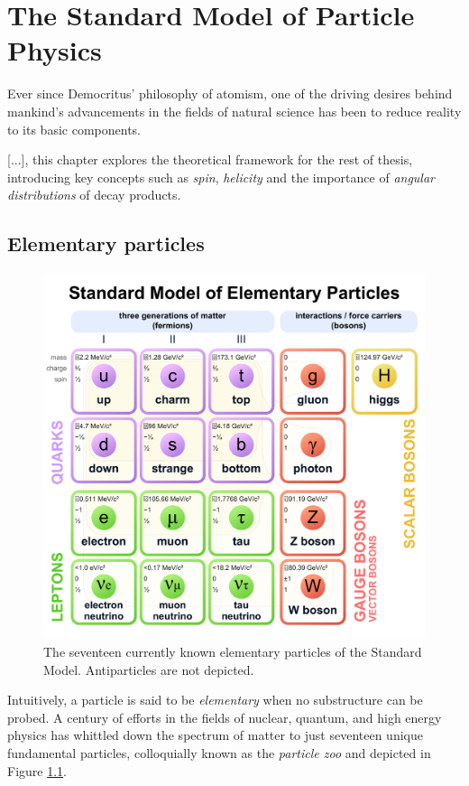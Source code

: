 \chapter{The Standard Model of Particle Physics}

Ever since Democritus' philosophy of atomism, one of the driving desires behind mankind's advancements in the fields of natural science has been to reduce reality to its basic components.

[...], this chapter explores the theoretical framework for the rest of thesis, introducing key concepts such as \textit{spin}, \textit{helicity} and the importance of \textit{angular distributions} of decay products.

\section{Elementary particles}
\begin{figure}[t!]
	\centering
	\includegraphics[scale=0.15]{graphics/01-standard_model/Standard_Model_of_Elementary_Particles.pdf}
	\caption[Currently known Standard Model elementary particles.]{The seventeen currently known elementary particles of the Standard Model. Antiparticles are not depicted.}
	\label{fig:particle_zoo}
\end{figure}

Intuitively, a particle is said to be \textit{elementary} when no substructure can be probed. 
A century of efforts in the fields of nuclear, quantum, and high energy physics has whittled down the spectrum of matter to just seventeen unique fundamental particles, colloquially known as the \textit{particle zoo} and depicted in Figure \ref{fig:particle_zoo}.

